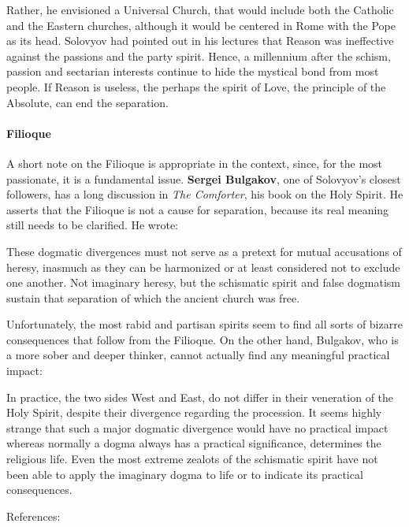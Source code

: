Rather, he envisioned a Universal Church, that would include both the Catholic and the Eastern churches, although it would be centered in Rome with the Pope as its head. Solovyov had pointed out in his lectures that Reason was ineffective against the passions and the party spirit. Hence, a millennium after the schism, passion and sectarian interests continue to hide the mystical bond from most people. If Reason is useless, the perhaps the spirit of Love, the principle of the Absolute, can end the separation.

\paragraph{Filioque}
A short note on the Filioque is appropriate in the context, since, for the most passionate, it is a fundamental issue. \textbf{Sergei Bulgakov}, one of Solovyov's closest followers, has a long discussion in \emph{The Comforter}, his book on the Holy Spirit. He asserts that the Filioque is not a cause for separation, because its real meaning still needs to be clarified. He wrote:

\begin{quotex}
These dogmatic divergences must not serve as a pretext for mutual accusations of heresy, inasmuch as they can be harmonized or at least considered not to exclude one another. Not imaginary heresy, but the schismatic spirit and false dogmatism sustain that separation of which the ancient church was free. 

\end{quotex}
Unfortunately, the most rabid and partisan spirits seem to find all sorts of bizarre consequences that follow from the Filioque. On the other hand, Bulgakov, who is a more sober and deeper thinker, cannot actually find any meaningful practical impact:

\begin{quotex}
In practice, the two sides West and East, do not differ in their veneration of the Holy Spirit, despite their divergence regarding the procession. It seems highly strange that such a major dogmatic divergence would have no practical impact whereas normally a dogma always has a practical significance, determines the religious life. Even the most extreme zealots of the schismatic spirit have not been able to apply the imaginary dogma to life or to indicate its practical consequences. 

\end{quotex}


References:

